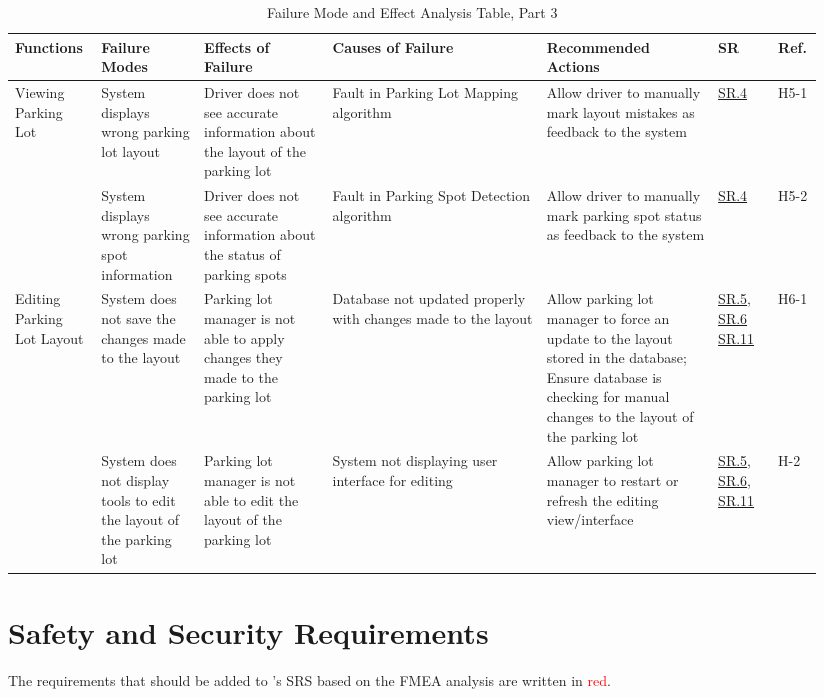 \documentclass[12pt,letterpaper]{article}
\begin{document}
\begin{landscape}
\begin{table}[hp]
\begin{tabular}{|p{0.09\linewidth}|p{0.12\linewidth}|p{0.15\linewidth}|p{0.25\linewidth}|p{0.2\linewidth}|p{0.075\linewidth}|p{0.05\linewidth}|}
\hline
Functions & Failure Modes & Effects of Failure & Causes of Failure & Recommended
Actions & SR & Ref.\\
\hline
Viewing Parking Lot & System displays wrong parking lot layout & Driver does not
see accurate information about the layout of the parking lot & Fault in Parking
Lot Mapping algorithm & Allow driver to manually mark layout mistakes as
feedback to the system & \hyperref[isr4]{SR.4} & H5-1\\\cline{2-7} & System
displays wrong parking spot information & Driver does not see accurate
information about the status of parking spots & Fault in Parking Spot Detection
algorithm & Allow driver to manually mark parking spot status as feedback to the
system & \hyperref[isr4]{SR.4} & H5-2\\
\hline
Editing Parking Lot Layout & System does not save the changes made to the layout
& Parking lot manager is not able to apply changes they made to the parking lot
& Database not updated properly with changes made to the layout & Allow parking
lot manager to force an update to the layout stored in the database; Ensure
database is checking for manual changes to the layout of the parking lot &
\hyperref[isr5]{SR.5}, \hyperref[isr6]{SR.6} \hyperref[isr11]{SR.11} &
H6-1\\\cline{2-7} & System does not display tools to edit the layout of the
parking lot & Parking lot manager is not able to edit the layout of the parking
lot & System not displaying user interface for editing & Allow parking lot
manager to restart or refresh the editing view/interface &
\hyperref[isr5]{SR.5}, \hyperref[isr6]{SR.6}, \hyperref[isr11]{SR.11} & H-2\\
\hline
\end{tabular}
\caption{Failure Mode and Effect Analysis Table, Part 3} \label{TblFMEA3}
\end{table}

\end{landscape}

\newpage

\restoregeometry

\section{Safety and Security Requirements}
The requirements that should be added to \progname's SRS based on the FMEA
analysis are written in \textcolor{red}{red}.
\end{document}
